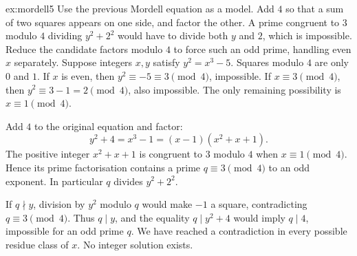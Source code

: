 \begin{solution}{ex:mordell5}
\idea Use the previous Mordell equation as a model. Add $4$ so that a sum of two squares appears on one side, and factor the other. A prime congruent to $3$ modulo $4$ dividing $y^2+2^2$ would have to divide both $y$ and $2$, which is impossible. Reduce the candidate factors modulo $4$ to force such an odd prime, handling even $x$ separately.
\writeup Suppose integers $x,y$ satisfy $y^2=x^3-5$. Squares modulo $4$ are only $0$ and $1$. If $x$ is even, then $y^2\equiv-5\equiv3\pmod4$, impossible. If $x\equiv3\pmod4$, then $y^2\equiv3-1=2\pmod4$, also impossible. The only remaining possibility is $x\equiv1\pmod4$.

Add $4$ to the original equation and factor:
\[
y^2+4=x^3-1=(x-1)(x^2+x+1).
\]
The positive integer $x^2+x+1$ is congruent to $3$ modulo $4$ when $x\equiv1\pmod4$. Hence its prime factorisation contains a prime $q\equiv3\pmod4$ to an odd exponent. In particular $q$ divides $y^2+2^2$.

If $q\nmid y$, division by $y^2$ modulo $q$ would make $-1$ a square, contradicting $q\equiv3\pmod4$. Thus $q\mid y$, and the equality $q\mid y^2+4$ would imply $q\mid4$, impossible for an odd prime $q$. We have reached a contradiction in every possible residue class of $x$. No integer solution exists.
\end{solution}


